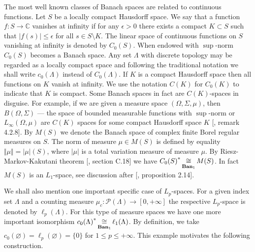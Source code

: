 The most well known classes of Banach spaces are related to continuous
functions. Let $S$ be a locally compact Hausdorff space. We say that a function
$f:S\to\mathbb{C}$ vanishes at infinity  if for any $\epsilon>0$ there exists a
compact $K\subset S$ such that $|f(s)|\leq\epsilon$ for all $s\in S\setminus K$.
The linear space of continuous functions on $S$ vanishing at infinity is denoted
by $C_0(S)$. When endowed with $\sup$-norm $C_0(S)$ becomes a Banach space. Any
set $\Lambda$ with discrete topology may be regarded as a locally compact space
and following the traditional notation we shall write $c_0(\Lambda)$ instead of
$C_0(\Lambda)$. If $K$ is a compact Hausdorff space then all functions on $K$
vanish at infinity. We use the notation $C(K)$ for $C_0(K)$ to indicate that $K$
is compact. Some Banach spaces in fact are $C(K)$-spaces in disguise. For
example, if we are given a measure space $(\Omega,\Sigma,\mu)$, then
$B(\Omega,\Sigma)$ --- the space of bounded measurable functions with
$\sup$-norm or $L_\infty(\Omega,\mu)$ are $C(K)$ spaces for some compact
Hausdorff space $K$ [\cite{KalAlbTopicsBanSpTh}, remark 4.2.8]. 
By $M(S)$ we denote the Banach space of
complex finite Borel regular measures on $S$. The norm of measure $\mu\in M(S)$
is defined by equality $\Vert\mu\Vert=|\mu|(S)$, where $|\mu|$ is a total
variation measure of measure $\mu$. By Riesz-Markov-Kakutani theorem
[\cite{ConwACoursInFuncAn}, section C.18] we have
${C_0(S)}^*\mathop{\mathbin{\cong}}\limits_{\mathbf{Ban}_1}M(S)$. In fact $M(S)$ is an $L_1$-space, see
discussion after [\cite{DalLauSecondDualOfMeasAlg}, proposition 2.14]. 

We shall also mention one important specific case of $L_p$-spaces. For a given
index set $\Lambda$ and a counting measure
$\mu_c:\mathcal{P}(\Lambda)\to[0,+\infty]$ the respective $L_p$-space is denoted
by $\ell_p(\Lambda)$. For this type of measure spaces we have one more important
isomorphism ${c_0(\Lambda)}^*\mathop{\mathbin{\cong}}\limits_{\mathbf{Ban}_1}\ell_1(\Lambda)$. By definition, 
we take $c_0(\varnothing)=\ell_p(\varnothing)= \{0 \}$ for 
$1\leq p\leq+\infty$. This example motivates the following construction.

